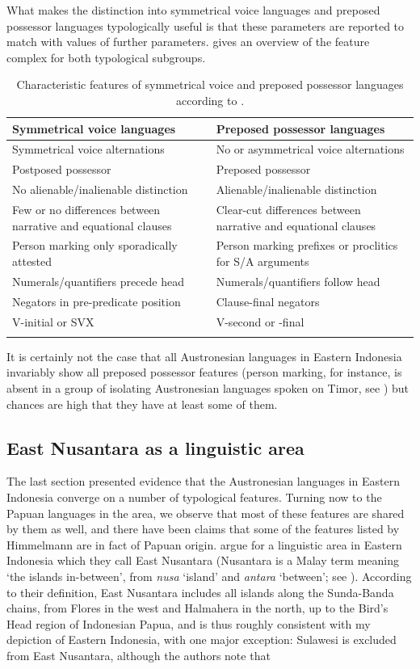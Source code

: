 What makes the distinction into symmetrical voice languages and preposed possessor languages typologically useful is that these parameters are reported to match with values of further parameters.  gives an overview of the feature complex for both typological subgroups. 

\begin{table}[ht]
\begin{tabularx}{\textwidth}{QQ}
\lsptoprule
Symmetrical voice languages & Preposed possessor languages \tabularnewline
\midrule
Symmetrical voice alternations & No or asymmetrical voice alternations \tabularnewline
Postposed possessor & Preposed possessor \tabularnewline
No alienable/inalienable distinction & Alienable/inalienable distinction \tabularnewline
Few or no differences between narrative and equational clauses & Clear-cut differences between narrative and equational clauses \tabularnewline
Person marking only sporadically attested & Person marking prefixes or proclitics for S/A arguments \tabularnewline
Numerals/quantifiers precede head & Numerals/quantifiers follow head \tabularnewline
Negators in pre-predicate position & Clause-final negators \tabularnewline
V-initial or SVX & V-second or -final \tabularnewline
\lspbottomrule
\end{tabularx}
\caption[Characteristic features of symmetrical voice and preposed possessor languages]{Characteristic features of symmetrical voice and preposed possessor languages according to \citet[175]{Himmelmann2005austronesian}.}
\label{table:sympre}
\end{table}

It is certainly not the case that all Austronesian languages in Eastern Indonesia invariably show all preposed possessor features (person marking, for instance, is absent in a group of isolating Austronesian languages spoken on Timor, see \citealt[175]{Himmelmann2005austronesian}) but chances are high that they have at least some of them. 

\subsection{East Nusantara as a linguistic area}\label{sec:nusantara}

The last section presented evidence that the Austronesian languages in Eastern Indonesia converge on a number of typological features. Turning now to the Papuan languages in the area, we observe that most of these features are shared by them as well, and there have been claims that some of the features listed by Himmelmann are in fact of Papuan origin. \citet{klamer2008east} argue for a linguistic area in Eastern Indonesia which they call East Nusantara (Nusantara is a Malay term meaning `the islands in-between', from \textit{nusa} `island' and \textit{antara} `between'; see \citealt[99]{klamer2008east}). According to their definition, East Nusantara includes all islands along the Sunda-Banda chains, from Flores in the west and Halmahera in the north, up to the Bird's Head region of Indonesian Papua, and is thus roughly consistent with my depiction of Eastern Indonesia, with one major exception: Sulawesi is excluded from East Nusantara, although the authors note that 

